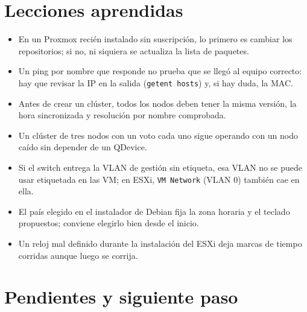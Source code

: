\documentclass[11pt,a4paper]{article}
\begin{document}
\section{Lecciones aprendidas}
\begin{itemize}
  \item En un Proxmox recién instalado sin suscripción, lo primero es cambiar los repositorios; si no, ni siquiera se actualiza la lista de paquetes.
  \item Un ping por nombre que responde no prueba que se llegó al equipo correcto: hay que revisar la IP en la salida (\texttt{getent hosts}) y, si hay duda, la MAC.
  \item Antes de crear un clúster, todos los nodos deben tener la misma versión, la hora sincronizada y resolución por nombre comprobada.
  \item Un clúster de tres nodos con un voto cada uno sigue operando con un nodo caído sin depender de un QDevice.
  \item Si el switch entrega la VLAN de gestión sin etiqueta, esa VLAN no se puede usar etiquetada en las VM; en ESXi, \texttt{VM Network} (VLAN 0) también cae en ella.
  \item El país elegido en el instalador de Debian fija la zona horaria y el teclado propuestos; conviene elegirlo bien desde el inicio.
  \item Un reloj mal definido durante la instalación del ESXi deja marcas de tiempo corridas aunque luego se corrija.
\end{itemize}

\section{Pendientes y siguiente paso}
\end{document}
